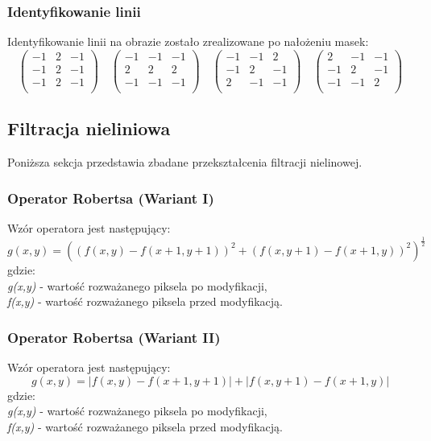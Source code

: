 \documentclass{classrep}
\begin{document}
\subsubsection{Identyfikowanie linii}
Identyfikowanie linii na obrazie zostało zrealizowane po nałożeniu masek:
\[
 \begin{pmatrix}
  -1 & 2 & -1 \\
  -1 & 2 & -1 \\
  -1 & 2 & -1 \\
 \end{pmatrix}
\quad
 \begin{pmatrix}
  -1 & -1 & -1 \\
  2 & 2 & 2 \\
 -1 & -1 & -1 \\
 \end{pmatrix}
\quad
 \begin{pmatrix}
  -1 & -1 & 2 \\
  -1 & 2 & -1 \\
  2 & -1 & -1 \\
 \end{pmatrix}
\quad
 \begin{pmatrix}
  2 & -1 & -1 \\
  -1 & 2 & -1 \\
  -1 & -1 & 2 \\
 \end{pmatrix}
\]

\subsection{Filtracja nieliniowa}
Poniższa sekcja przedstawia zbadane przekształcenia filtracji nielinowej.

\subsubsection{Operator Robertsa (Wariant I)}
Wzór operatora jest następujący:
\[ g(x,y) = ((f(x,y) - f(x + 1, y + 1))^2 + (f(x,y + 1) - f(x + 1,y))^2)^\frac{1}{2} \]
gdzie:\\
\textit{g(x,y)} - wartość rozważanego piksela po modyfikacji,\\
\textit{f(x,y)} - wartość rozważanego piksela przed modyfikacją.

\subsubsection{Operator Robertsa (Wariant II)}
Wzór operatora jest następujący:
\[ g(x,y) = |f(x,y) - f(x + 1, y + 1)| + |f(x,y + 1) - f(x + 1,y)| \]
gdzie:\\
\textit{g(x,y)} - wartość rozważanego piksela po modyfikacji,\\
\textit{f(x,y)} - wartość rozważanego piksela przed modyfikacją.
\end{document}
